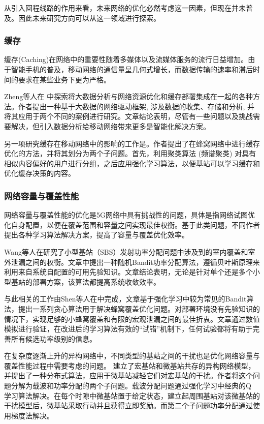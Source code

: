 ﻿\documentclass[11pt,draftclsnofoot,onecolumn,journal,letterpaper]{IEEEtran}
\begin{document}
从引入回程线路的作用来看，未来网络的优化必然考虑这一因素，但现在并未普及。因此未来研究方向可以从这一领域进行探索。

\subsubsection{缓存}

缓存(Caching)在网络中的重要性随着多媒体以及流媒体服务的流行日益增加。由于智能手机的普及，移动网络的通信量呈几何式增长，而数据传输的速率和滞后时间的要求在某些业务下更为严格。

Zheng等人在\cite{Zheng2016} 中探索将大数据分析与网络资源优化和缓存部署集成在一起的各种方法。作者提出一种基于大数据的网络驱动框架, 涉及数据的收集、存储和分析, 并将其应用于两个不同的案例进行研究。文章结论表明，尽管有一些问题以及挑战需要解决，但引入数据分析给移动网络带来更多是智能化解决方案。


另一项研究缓存在移动网络中的影响的工作是\cite{ElBamby2014}。作者提出了在蜂窝网络中进行缓存优化的方法，并将其划分为两个子问题。首先，利用聚类算法 (频谱聚类) 对具有相似内容偏好的用户进行分组，之后应用强化学习算法，以便基站可以学习缓存和优化缓存决策的内容。


\subsubsection{网络容量与覆盖性能}
网络容量与覆盖性能的优化是5G网络中具有挑战性的问题，具体是指网络试图优化自身配置，以便在覆盖范围和容量之间实现最佳权衡。基于此类问题，不同作者提出各种学习算法解决方案，提高了容量与覆盖优化效率。

Wang等人在\cite{Wang2017}研究了小型基站（SBS）发射功率分配问题中涉及到的室内覆盖和室外泄漏之间的权衡。文章中提出一种随机Bandit功率分配算法，遵循贝叶斯原理来利用来自系统自配置的可用先验知识。文章结论表明，无论是针对单个还是多个小型基站的部署方案，该算法都提高系统收敛效率。

与此相关的工作由Shen等人在\cite{Shen2018}中完成，文章基于强化学习中较为常见的Bandit算法，提出一系列贪心算法用于解决蜂窝覆盖优化问题。对部署环境没有先验知识的情况下，实现足够的小蜂窝覆盖和有限的宏观泄漏之间的最佳折衷。文章通过数值模拟进行验证，在改进后的学习算法有效的“试错”机制下，任何试验都将有助于完善所有候选功率级别的信息。

在复杂度逐渐上升的异构网络中，不同类型的基站之间的干扰也是优化网络容量与覆盖性能过程中需要考虑的问题。
\cite{Bennis2010}建立了宏基站和微基站共存的异构网络模型，并提出了一种分布式算法，应用于微基站减轻它们对宏基站的干扰。作者将这个问题分解为载波和功率分配的两个子问题。载波分配问题通过强化学习中经典的Q 学习算法解决。在每个时隙中微基站置于给定状态，建立起周围基站对该微基站的干扰模型后，微基站采取行动并且获得立即奖励。而第二个子问题功率分配通过使用梯度法解决。
\end{document}
